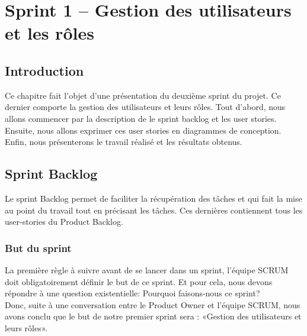 \chapter{Sprint 1 – Gestion des utilisateurs et les rôles}
	
\section*{Introduction}
Ce chapitre fait l’objet d’une présentation du deuxième sprint du projet. Ce dernier comporte la gestion des utilisateurs et leurs rôles.
Tout d'abord, nous allons commencer par la description de le sprint backlog et les user stories. Ensuite, nous allons exprimer ces user stories en diagrammes de conception. Enfin, nous présenterons le travail réalisé et les résultats obtenus.
\section[Sprint Backlog]{Sprint Backlog}
Le sprint Backlog permet de faciliter la récupération des tâches et qui fait la mise au point du travail tout en précisant les tâches. Ces dernières contiennent tous les user-stories du Product Backlog.
\subsection[But du sprint]{But du sprint}
La première règle à suivre avant de se lancer dans un sprint, l’équipe SCRUM doit obligatoirement définir le but de ce sprint. Et pour cela, nous devons répondre à une question existentielle: Pourquoi faisons-nous ce sprint?\\
Donc, suite à une conversation entre le Product Owner et l’équipe SCRUM, nous avons conclu que le but de notre premier sprint sera : «Gestion des utilisateurs et leurs rôles».
